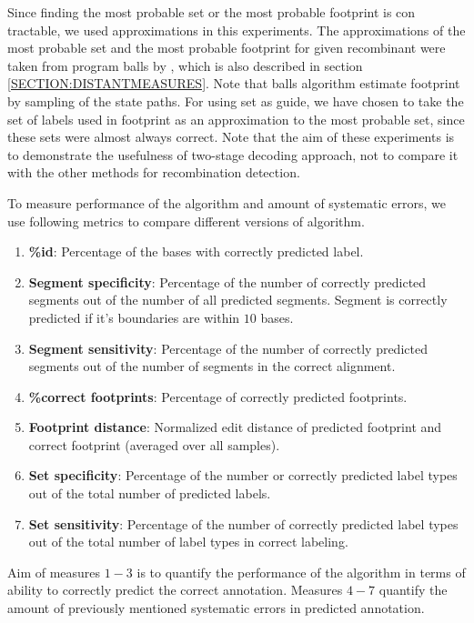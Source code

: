 Since finding the most probable set or the most probable footprint is con
tractable, we used approximations in this experiments. The approximations of the
most probable set and the most probable footprint for given recombinant were
taken from program balls by \cite{Brown2010}, which is also described in section
\ref{SECTION:DISTANTMEASURES}. Note that balls algorithm estimate footprint by
sampling of the state paths. For using set as guide, we have chosen to take the
set of labels used in footprint as an approximation to the most probable set,
since these sets were almost always correct. Note that the aim of these
experiments is to demonstrate the usefulness of two-stage decoding approach, not
to compare it with the other methods for recombination detection.

To measure performance of the algorithm and amount of systematic errors, we use
following metrics to compare different versions of algorithm.
\begin{enumerate}
\item {\bf \%id}: Percentage of the bases with correctly predicted label.

\item {\bf Segment specificity}: Percentage of the number of correctly predicted
segments out of the number of all predicted segments. Segment is correctly
predicted if it's boundaries are within $10$ bases.

\item {\bf Segment sensitivity}: Percentage of the number of correctly predicted
segments out of the number of segments in the correct alignment.

\item {\bf \%correct footprints}: Percentage of correctly predicted footprints.

\item {\bf Footprint distance}: Normalized edit distance of predicted footprint
and correct footprint (averaged over all samples).

\item {\bf Set specificity}: Percentage of the number or correctly predicted label
types out of the total number of predicted labels.

\item {\bf Set sensitivity}: Percentage of the number of correctly predicted label
types out of the total number of label types in correct labeling.

\end{enumerate} 
Aim of measures $1-3$ is to quantify the performance of the algorithm in terms
of ability to correctly predict the correct annotation. Measures $4-7$ quantify
the amount of previously mentioned systematic errors in predicted annotation.


